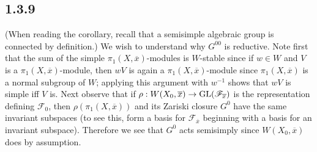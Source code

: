\documentclass[deligne.tex]{subfiles}
\begin{document}
\subsection*{1.3.9} 
(When reading the corollary, recall that a semisimple algebraic group is 
connected by definition.)
We wish to understand why $G^{00}$ is reductive.
Note first that the sum of the simple $\pi_1(X,\overline x)$-modules is
$W$-stable since if $w\in W$ and $V$ is a $\pi_1(X,\overline x)$-module, 
then $wV$ is again a $\pi_1(X,\overline x)$-module since
$\pi_1(X,\overline x)$ is a normal subgroup of $W$; applying
this argument with $w^{-1}$ shows that $wV$ is simple iff $V$ is.
Next observe that if
$\rho:W(X_0,\overline x)\rightarrow\operatorname{GL}(\mathscr F_{\overline x})$ 
is the representation defining $\mathscr F_0$, then
$\rho(\pi_1(X,\overline x))$ and its
Zariski closure $G^0$ have the same invariant subspaces (to see this,
form a basis for $\mathscr F_{\overline x}$ beginning with a basis for an 
invariant subspace). Therefore we see that $G^0$ acts semisimply since
$W(X_0,\overline x)$ does by assumption.
\end{document}
